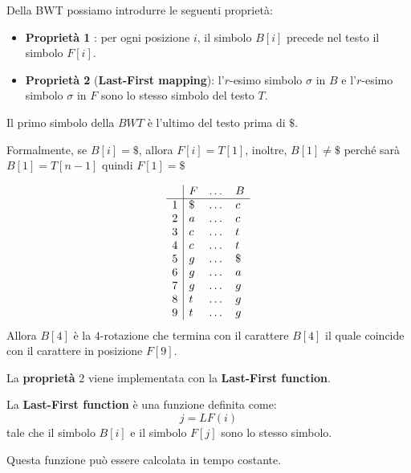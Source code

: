 Della BWT possiamo introdurre le seguenti proprietà:
\begin{itemize}
    \item \textbf{Proprietà 1} \label{proprietà-1}: per ogni posizione $i$, il
          simbolo $B[i]$ precede nel testo il simbolo $F[i]$.
    \item \textbf{Proprietà 2} \label{lfmapping} (\textbf{Last-First mapping}):
          l'$r$-esimo simbolo $\sigma$ in $B$ e l'$r$-esimo simbolo $\sigma$ in
          $F$ sono lo stesso simbolo del testo $T$.
\end{itemize}
\begin{nota}
    Il primo simbolo della $BWT$ è l'ultimo del testo prima di $\$$.

    Formalmente, se $B[i] = \$$, allora $F[i] = T[1]$, inoltre,
    $B[1] \neq \$$ perché sarà $B[1] = T[n - 1] $ quindi $F[1] = \$$
\end{nota}
\begin{esempio} %
    \begin{equation}
        \begin{array}{l|l c l}
              & F  & \dots & B  \\
            \hline
            1 & \$ & \dots & c  \\
            2 & a  & \dots & c  \\
            3 & c  & \dots & t  \\
            4 & c  & \dots & t  \\
            5 & g  & \dots & \$ \\
            6 & g  & \dots & a  \\
            7 & g  & \dots & g  \\
            8 & t  & \dots & g  \\
            9 & t  & \dots & g  \\
        \end{array}
    \end{equation}
    Allora $B[4]$ è la $4$-rotazione che termina con il carattere $B[4]$ il quale
    coincide con il carattere in posizione $F[9]$.
\end{esempio}
La \textbf{proprietà} $2$ viene implementata con la \textbf{Last-First function}.
\begin{definizione}
    La \textbf{Last-First function} è una funzione definita come:
    \begin{equation}
        j = LF(i)
    \end{equation}
    tale che il simbolo $B[i]$ e il simbolo $F[j]$ sono lo stesso simbolo.
\end{definizione}
Questa funzione può essere calcolata in tempo costante.


